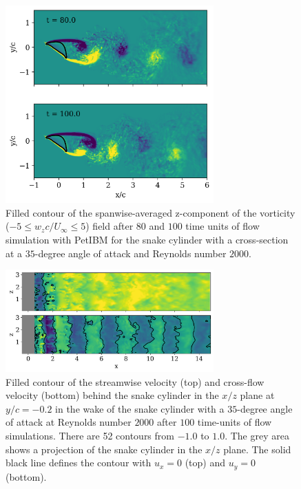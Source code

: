 \documentclass[10pt,journal,compsoc]{IEEEtran}
\begin{document}
\begin{figure}[!h]
    \centering
    \includegraphics[width=8cm]{figures/wz_avg_multi_contourf.png}
    \caption{Filled contour of the spanwise-averaged z-component of the vorticity ($-5 \leq w_z c / U_\infty \leq 5$) field after $80$ and $100$ time units of flow simulation with PetIBM for the snake cylinder with a cross-section at a $35$-degree angle of attack and Reynolds number $2000$.}
    \label{fig:wz_avg_3d}
\end{figure}

\begin{figure}[!h]
    \centering
    \includegraphics[width=8cm]{figures/ux_uy_xz_plane.png}
    \caption{Filled contour of the streamwise velocity (top) and cross-flow velocity (bottom) behind the snake cylinder in the $x/z$ plane at $y/c=-0.2$ in the wake of the snake cylinder with a $35$-degree angle of attack at Reynolds number $2000$ after $100$ time-units of flow simulations. There are 52 contours from $-1.0$ to $1.0$. The grey area shows a projection of the snake cylinder in the $x/z$ plane. The solid black line defines the contour with $u_x = 0$ (top) and $u_y = 0$ (bottom).}
    \label{fig:ux_uy_xz_plane_3d}
\end{figure}
\end{document}
